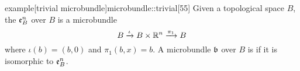 \begin{mystatement}{example}[trivial microbundle]{microbundle::trivial}[55]
    Given a topological space $B$, the  $\mathfrak{e}^{n}_{B}$ over $B$ is a microbundle
    \[ B \xrightarrow{\iota} B \times \mathbb{R}^n \xrightarrow{\pi_1} B{} \]
    where $\iota(b) = (b, 0)$ and $\pi_1(b, x) = b$.
    A microbundle $\bb$ over $B$ is  if it is isomorphic to $\mathfrak{e}^{n}_{B}$.
\end{mystatement}